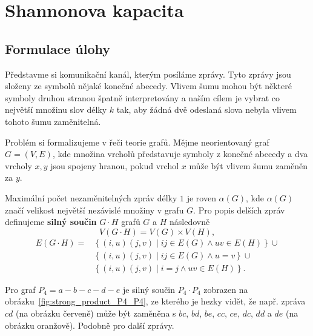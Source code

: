 \chapter{Shannonova kapacita}

\section{Formulace úlohy}

Představme si komunikační kanál, kterým posíláme zprávy. Tyto zprávy jsou složeny ze symbolů nějaké konečné abecedy. Vlivem šumu mohou být některé symboly druhou stranou špatně interpretovány a naším cílem je vybrat co největší množinu slov délky $k$ tak, aby žádná dvě odeslaná slova nebyla vlivem tohoto šumu zaměnitelná.

Problém si formalizujeme v řeči teorie grafů. Mějme neorientovaný graf $G = (V, E)$, kde množina vrcholů představuje symboly z konečné abecedy a dva vrcholy $x, y$ jsou spojeny hranou, pokud vrchol $x$ může být vlivem šumu zaměněn za $y$.

Maximální počet nezaměnitelných zpráv délky $1$ je roven $\alpha(G)$, kde $\alpha(G)$ značí velikost největší nezávislé množiny v grafu $G$. Pro popis delších zpráv definujeme \textbf{silný součin} $G \cdot H$ grafů $G$ a $H$ následovně
\begin{equation*}
    V(G \cdot H) = V(G) \times V(H),
\end{equation*}
\begin{equation*}
    \begin{split}
    E(G \cdot H) = &\left\{ (i,u)(j,v) \mid ij \in E(G) \wedge uv \in E(H) \right\} \cup \\
                   &\left\{ (i,u)(j,v) \mid ij \in E(G) \wedge u = v \right\} \cup \\
                   &\left\{ (i,u)(j,v) \mid i = j \wedge uv \in E(H) \right\}.
    \end{split}
\end{equation*}

\begin{pr}
Pro graf $P_4 = a-b-c-d-e$ je silný součin $P_4 \cdot P_4$ zobrazen na obrázku~\ref{fig:strong_product_P4_P4}, ze kterého je hezky vidět, že např. zpráva $cd$ (na obrázku červeně) může být zaměněna s $bc$, $bd$, $be$, $cc$, $ce$, $dc$, $dd$ a $de$ (na obrázku oranžově). Podobně pro další zprávy.
\end{pr}

